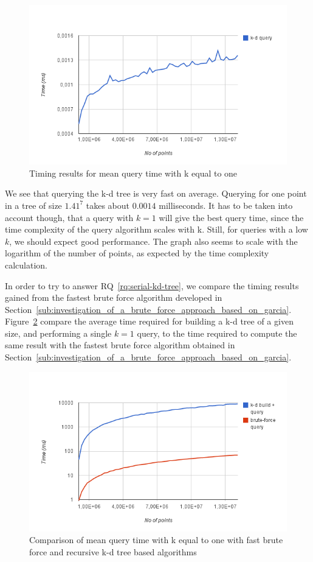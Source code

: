 \begin{figure}[ht!]
    \centering
    \includegraphics[width=120mm]{../gfx/serial-query.png}
    \caption{Timing results for mean query time with k equal to one}
    \label{fig:serial-query}
\end{figure}

We see that querying the k-d tree is very fast on average. Querying for one point in a tree of size $1.41^7$ takes about $0.0014$ milliseconds. It has to be taken into account though, that a query with $k=1$ will give the best query time, since the time complexity of the query algorithm scales with k. Still, for queries with a low $k$, we should expect good performance. The graph also seems to scale with the logarithm of the number of points, as expected by the time complexity calculation.

In order to try to answer RQ~\ref{rq:serial-kd-tree}, we compare the timing results gained from the fastest brute force algorithm developed in Section~\ref{sub:investigation_of_a_brute_force_approach_based_on_garcia}. Figure~\ref{fig:brute-force-vs-serial-build-query} compare the average time required for building a k-d tree of a given size, and performing a single $k=1$ query, to the time required to compute the same result with the fastest brute force algorithm obtained in Section~\ref{sub:investigation_of_a_brute_force_approach_based_on_garcia}.

\begin{figure}[ht!]
\centering
\includegraphics[width=120mm]{../gfx/brute-force-vs-serial-build-query.png}
\caption{Comparison of mean query time with k equal to one with fast brute force and recursive k-d tree based algorithms}
\label{fig:brute-force-vs-serial-build-query}
\end{figure}

